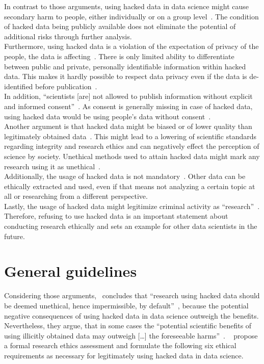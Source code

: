 In contrast to those arguments, using hacked data in data science might cause secondary harm to people, either individually or on a group level~\parencites[][746]{nature}[23]{acm}.
The condition of hacked data being publicly available does not eliminate the potential of additional risks through further analysis.\\
Furthermore, using hacked data is a violation of the expectation of privacy of the people, the data is affecting~\parencite[][5]{patreon}.
There is only limited ability to differentiate between public and private, personally identifiable information within hacked data.
This makes it hardly possible to respect data privacy even if the data is de-identified before publication~\parencite[][746]{nature}.\\
In addition, ``scientists [are] not allowed to publish information without explicit and informed consent''~\parencite[][745]{nature}.
As consent is generally missing in case of hacked data, using hacked data would be using people's data without consent~\parencite[][5]{patreon}.\\
Another argument is that hacked data might be biased or of lower quality than legitimately obtained data~\parencite[][746]{nature}.
This might lead to a lowering of scientific standards regarding integrity and research ethics and can negatively effect the perception of science by society.
Unethical methods used to attain hacked data might mark any research using it as unethical~\parencite[][24]{acm}.\\
Additionally, the usage of hacked data is not mandatory~\parencite[][5]{patreon}.
Other data can be ethically extracted and used, even if that means not analyzing a certain topic at all or researching from a different perspective.\\
Lastly, the usage of hacked data might legitimize criminal activity as ``research''~\parencites[][5]{patreon}[][24]{acm}.
Therefore, refusing to use hacked data is an important statement about conducting research ethically and sets an example for other data scientists in the future.

\section*{General guidelines}

Considering those arguments,~\textcite{nature} concludes that ``research using hacked data should be deemed unethical, hence impermissible, by default''~\parencite[][747]{nature}, because the potential negative consequences of using hacked data in data science outweigh the benefits.
Nevertheless, they argue, that in some cases the ``potential scientific benefits of using illicitly obtained data may outweigh [\ldots] the foreseeable harms''~\parencite[][747]{nature}.
~\textcite[747-748]{nature} propose a formal research ethics assessment and formulate the following six ethical requirements as necessary for legitimately using hacked data in data science.

